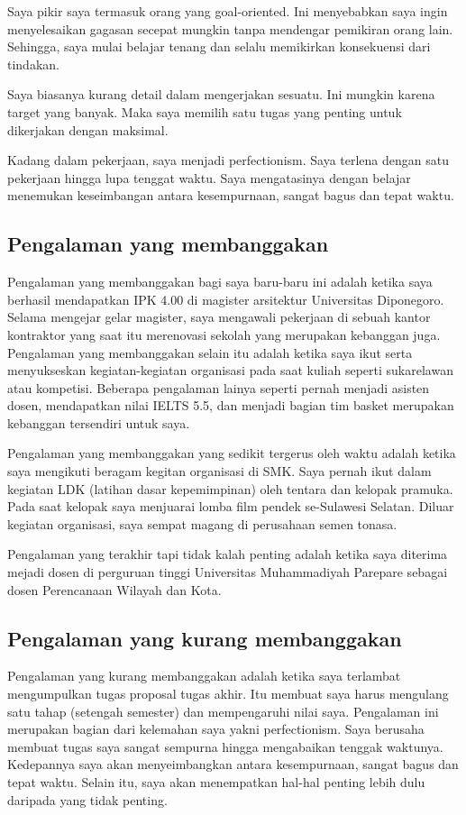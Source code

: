 \documentclass[../main.tex]{subfiles}
\begin{document}
Saya pikir saya termasuk orang yang goal-oriented. Ini menyebabkan saya ingin menyelesaikan gagasan secepat mungkin tanpa mendengar pemikiran orang lain. Sehingga, saya mulai belajar tenang dan selalu memikirkan konsekuensi dari tindakan.

Saya biasanya kurang detail dalam mengerjakan sesuatu. Ini mungkin karena target yang banyak. Maka saya memilih satu tugas yang penting untuk dikerjakan dengan maksimal.

Kadang dalam pekerjaan, saya menjadi perfectionism. Saya terlena dengan satu pekerjaan hingga lupa tenggat waktu. Saya mengatasinya dengan belajar menemukan keseimbangan antara kesempurnaan, sangat bagus dan tepat waktu.

\subsection{Pengalaman yang membanggakan}
Pengalaman yang membanggakan bagi saya baru-baru ini adalah ketika saya berhasil mendapatkan IPK 4.00 di magister arsitektur Universitas Diponegoro.  Selama mengejar gelar magister, saya mengawali pekerjaan di sebuah kantor kontraktor yang saat itu merenovasi sekolah yang merupakan kebanggan juga.
Pengalaman yang membanggakan selain itu adalah ketika saya ikut serta menyukseskan kegiatan-kegiatan organisasi pada saat kuliah seperti sukarelawan atau kompetisi. Beberapa pengalaman lainya seperti pernah menjadi asisten dosen, mendapatkan nilai IELTS 5.5, dan menjadi bagian tim basket merupakan kebanggan tersendiri untuk saya.

Pengalaman yang membanggakan yang sedikit tergerus oleh waktu adalah ketika saya mengikuti beragam kegitan organisasi di SMK. Saya pernah ikut dalam kegiatan LDK (latihan dasar kepemimpinan) oleh tentara dan kelopak pramuka. Pada saat kelopak saya menjuarai lomba film pendek se-Sulawesi Selatan. Diluar kegiatan organisasi, saya sempat magang di perusahaan semen tonasa.

Pengalaman yang terakhir tapi tidak kalah penting adalah ketika saya diterima mejadi dosen di perguruan tinggi Universitas Muhammadiyah Parepare sebagai dosen Perencanaan Wilayah dan Kota.

\subsection{Pengalaman yang kurang membanggakan}

Pengalaman yang kurang membanggakan adalah ketika saya terlambat mengumpulkan tugas proposal tugas akhir. Itu membuat saya harus mengulang satu tahap (setengah semester) dan mempengaruhi nilai saya. Pengalaman ini merupakan bagian dari kelemahan saya yakni perfectionism. Saya berusaha membuat tugas saya sangat sempurna hingga mengabaikan tenggak waktunya. Kedepannya saya akan menyeimbangkan antara kesempurnaan, sangat bagus dan tepat waktu. Selain itu, saya akan menempatkan hal-hal penting lebih dulu daripada yang tidak penting.
\end{document}
